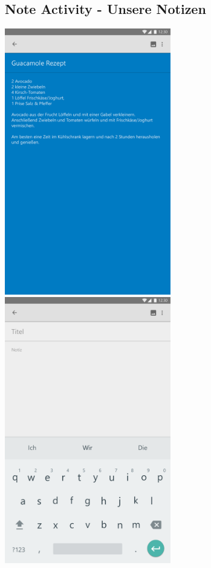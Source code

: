 \begin{figure}[H]
	\subsection*{Note Activity - Unsere Notizen}
	\centering
	\includegraphics[width=7.25cm]{img/NoteActivity.pdf}
	\includegraphics[width=7.25cm]{img/NoteActivityNew.pdf}

\end{figure}
